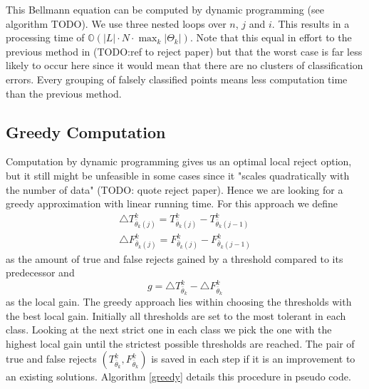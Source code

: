 This Bellmann equation can be computed by dynamic programming (see algorithm TODO). We use three nested loops over $n$, $j$ and $i$. This results in a processing time of $\mathbb{O}(|L| \cdot N \cdot \max_k \left|\Theta_k\right|)$. 
Note that this equal in effort to the previous method in (TODO:ref to reject paper) but that the worst case is far less likely to occur here since it would mean that there are no clusters of classification errors. Every grouping of falsely classified points means less computation time than the previous method.

\subsection{Greedy Computation}
\label{greedyAlg}
Computation by dynamic programming gives us an optimal local reject option, but it still might be unfeasible in some cases since it "scales quadratically with the number of data" (TODO: quote reject paper). Hence we are looking for a greedy approximation with linear running time. For this approach we define
\begin{align}
 	\bigtriangleup T_{\bar{\theta}_k(j)}^k = T_{\bar{\theta}_k(j)}^k-T_{\bar{\theta}_k(j-1)}^k \\
	\bigtriangleup F_{\bar{\theta}_k(j)}^k = F_{\bar{\theta}_k(j)}^k-F_{\bar{\theta}_k(j-1)}^k
\end{align}
as the amount of true and false rejects gained by a threshold compared to its predecessor and
$$ g = \bigtriangleup T_{\bar{\theta}_k}^k - \bigtriangleup F_{\bar{\theta}_k}^k $$
as the local gain. The greedy approach lies within choosing the thresholds with the best local gain. Initially all thresholds are set to the most tolerant in each class. Looking at the next strict one in each class we pick the one with the highest local gain until the strictest possible thresholds are reached. The pair of true and false rejects $\left(T_{\bar{\theta}_k}^k,F_{\bar{\theta}_k}^k\right)$ is saved in each step if it is an improvement to an existing solutions. Algorithm \ref{greedy} details this procedure in pseudo code. 

